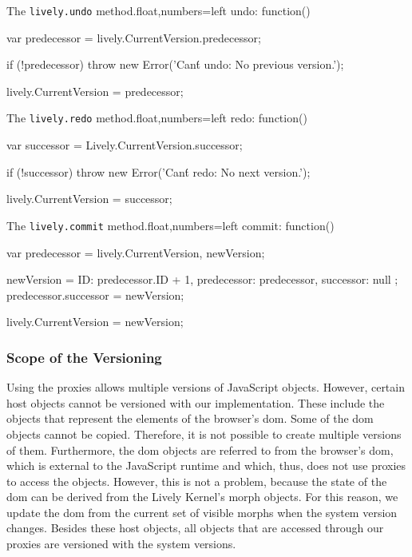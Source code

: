 \begin{code}{The \lstinline{lively.undo} method.}{float,numbers=left}
undo: function() {
    var predecessor = lively.CurrentVersion.predecessor;
    
    if (!predecessor) {
        throw new Error('Can\'t undo: No previous version.');
    }
    
    lively.CurrentVersion = predecessor;
}
\end{code}
\iffalse
\end{verbatim}\fi

\begin{code}{The \lstinline{lively.redo} method.}{float,numbers=left}
redo: function() {
    var successor = Lively.CurrentVersion.successor;
    
    if (!successor) {
        throw new Error('Can\'t redo: No next version.');
    }
    
    lively.CurrentVersion = successor;
}
\end{code}
\iffalse
\end{verbatim}\fi

\begin{code}{The \lstinline{lively.commit} method.}{float,numbers=left}
commit: function() {
    var predecessor = lively.CurrentVersion,
        newVersion;
    
    newVersion = {
        ID: predecessor.ID + 1,
        predecessor: predecessor,
        successor: null
    };
    predecessor.successor = newVersion;
    
    lively.CurrentVersion = newVersion;
}
\end{code}
\iffalse
\end{verbatim}\fi

 
\subsubsection{Scope of the Versioning} \label{subsubsec:IMPLEMENTATION:5.2.1}

Using the proxies allows multiple versions of JavaScript objects.
However, certain host objects cannot be versioned with our implementation.
These include the objects that represent the elements of the browser's \ac{dom}.
Some of the \ac{dom} objects cannot be copied.
Therefore, it is not possible to create multiple versions of them.
Furthermore, the \ac{dom} objects are referred to from the browser's \ac{dom}, which is external to the JavaScript runtime and which, thus, does not use proxies to access the objects.
However, this is not a problem, because the state of the \ac{dom} can be derived from the Lively Kernel's morph objects.
For this reason, we update the \ac{dom} from the current set of visible morphs when the system version changes.
Besides these host objects, all objects that are accessed through our proxies are versioned with the system versions.





